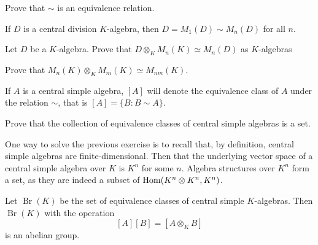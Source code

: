 \begin{exercise}
    Prove that $\sim$ is an equivalence relation. 
\end{exercise}

If $D$ is a central division $K$-algebra, then $D=M_1(D)\sim M_n(D)$ for all $n$.

\begin{exercise}
    Let $D$ be a $K$-algebra. 
    Prove that $D\otimes_K M_n(K)\simeq M_n(D)$ as $K$-algebras
\end{exercise}

\begin{exercise}
    Prove that $M_n(K)\otimes_K M_m(K)\simeq M_{nm}(K)$. 
\end{exercise}

If $A$ is a central simple algebra, $[A]$ will denote
the equivalence class of $A$ under the relation $\sim$, that is 
$[A]=\{B:B\sim A\}$. 

\begin{exercise}
    Prove that the collection of equivalence classes of central simple 
    algebras is a set. 
\end{exercise}

One way to solve the previous exercise is to recall that, by definition, central simple algebras
are finite-dimensional. Then that the underlying 
vector space of a central simple algebra over $K$ is $K^n$ for some $n$. Algebra
structures over $K^n$ form a set, as they are indeed a subset of $\operatorname{Hom}(K^n\otimes K^n,K^n)$. 

\begin{theorem}
    Let $\operatorname{Br}(K)$ be the set of equivalence classes
    of central simple $K$-algebras. Then $\operatorname{Br}(K)$ with 
    the operation 
    \begin{equation}
        \label{eq:Brauer}
        [A][B]=[A\otimes_KB]
    \end{equation}
    is an abelian group. 
\end{theorem}

